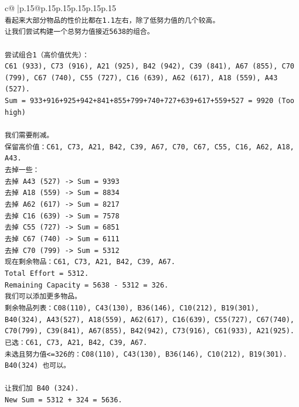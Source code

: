 \documentclass{article}
\begin{document}
{\begin{supertabular}{c@{$\;$}|p{.15\linewidth}@{}p{.15\linewidth}p{.15\linewidth}p{.15\linewidth}p{.15\linewidth}p{.15\linewidth}}
{{{\\ 
\texttt{看起来大部分物品的性价比都在1.1左右，除了低努力值的几个较高。} \\
\texttt{让我们尝试构建一个总努力值接近5638的组合。} \\
\\ 
\texttt{尝试组合1（高价值优先）：} \\
\texttt{C61 (933), C73 (916), A21 (925), B42 (942), C39 (841), A67 (855), C70 (799), C67 (740), C55 (727), C16 (639), A62 (617), A18 (559), A43 (527).} \\
\texttt{Sum = 933+916+925+942+841+855+799+740+727+639+617+559+527 = 9920 (Too high)} \\
\\ 
\texttt{我们需要削减。} \\
\texttt{保留高价值：C61, C73, A21, B42, C39, A67, C70, C67, C55, C16, A62, A18, A43.} \\
\texttt{去掉一些：} \\
\texttt{去掉 A43 (527) {-}> Sum = 9393} \\
\texttt{去掉 A18 (559) {-}> Sum = 8834} \\
\texttt{去掉 A62 (617) {-}> Sum = 8217} \\
\texttt{去掉 C16 (639) {-}> Sum = 7578} \\
\texttt{去掉 C55 (727) {-}> Sum = 6851} \\
\texttt{去掉 C67 (740) {-}> Sum = 6111} \\
\texttt{去掉 C70 (799) {-}> Sum = 5312} \\
\texttt{现在剩余物品：C61, C73, A21, B42, C39, A67.} \\
\texttt{Total Effort = 5312.} \\
\texttt{Remaining Capacity = 5638 {-} 5312 = 326.} \\
\texttt{我们可以添加更多物品。} \\
\texttt{剩余物品列表：C08(110), C43(130), B36(146), C10(212), B19(301), B40(324), A43(527), A18(559), A62(617), C16(639), C55(727), C67(740), C70(799), C39(841), A67(855), B42(942), C73(916), C61(933), A21(925).} \\
\texttt{已选：C61, C73, A21, B42, C39, A67.} \\
\texttt{未选且努力值<=326的：C08(110), C43(130), B36(146), C10(212), B19(301).} \\
\texttt{B40(324) 也可以。} \\
\\ 
\texttt{让我们加 B40 (324).} \\
\texttt{New Sum = 5312 + 324 = 5636.} \\
}}}
\end{supertabular}}
\end{document}
